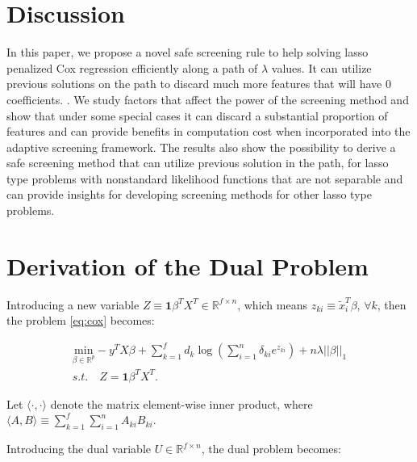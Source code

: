 \section{Discussion}

In this paper, we propose a novel safe screening rule to help solving lasso penalized Cox regression efficiently along a path of $\lambda$ values. It can utilize previous solutions on the path to discard much more features that will have 0 coefficients. . We study factors that affect the power of the screening method and show that under some special cases it can discard a substantial proportion of features and can provide benefits in computation cost when incorporated into the adaptive screening framework. The results also show the possibility to derive a safe screening method that can utilize previous solution in the path, for lasso type problems with nonstandard likelihood functions that are not separable and can provide insights for developing screening methods for other lasso type problems.

\appendix
\appendixpage


\section{Derivation of the Dual Problem}


Introducing a new variable $Z\equiv\mathbf{1}\beta^TX^T\in\mathbb{R}^{f\times n}$, which means $z_{ki}\equiv\tilde{x}_i^T\beta,\,\forall k$, then the problem \eqref{eq:cox} becomes:

\begin{equation}
    \label{eq:dual+z}
    \begin{gathered}
    \underset{\beta\in \mathbb{R}^p}{\mathrm{min}}-y^TX\beta+\sum_{k=1}^f d_k\log\left(\sum_{i=1}^n \delta_{ki} e^{z_{ki}}\right)+n\lambda||\beta||_1\\s.t.\quad Z=\mathbf{1}\beta^TX^T.
\end{gathered}
\end{equation}

Let $\langle\cdot,\cdot\rangle$ denote the matrix element-wise inner product, where $\langle A,B \rangle\equiv\sum_{k=1}^f\sum_{i=1}^nA_{ki}B_{ki}$.

Introducing the dual variable $U\in\mathbb{R}^{f\times n}$, the dual problem becomes:

